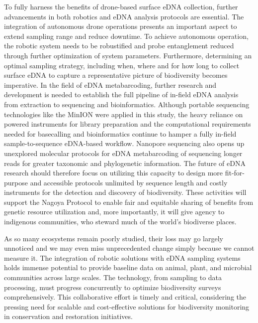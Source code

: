 To fully harness the benefits of drone-based surface \gls{eDNA} collection, further advancements in both robotics and \gls{eDNA} analysis protocols are essential. The integration of autonomous drone operations presents an important aspect to extend sampling range and reduce downtime. To achieve autonomous operation, the robotic system needs to be robustified and probe entanglement reduced through further optimization of system parameters. Furthermore, determining  an optimal sampling strategy, including when, where and for how long to collect surface \gls{eDNA} to capture a representative picture of biodiversity becomes imperative.
In the field of \gls{eDNA} metabarcoding, further research and development is needed to establish the full pipeline of in-field \gls{eDNA} analysis from extraction to sequencing and bioinformatics. Although portable sequencing technologies like the MinION were applied in this study, the heavy reliance on powered instruments for library preparation and the computational requirements needed for basecalling and bioinformatics continue to hamper a fully in-field sample-to-sequence eDNA-based workflow. Nanopore sequencing also opens up unexplored molecular protocols for \gls{eDNA} metabarcoding of sequencing longer reads for greater taxonomic and phylogenetic information. The future of \gls{eDNA} research should therefore focus on utilizing this capacity to design more fit-for-purpose and accessible protocols unlimited by sequence length and costly instruments for the detection and discovery of biodiversity. These activities will support the Nagoya Protocol \cite{nagoya} to enable fair and equitable sharing of benefits from genetic resource utilization and, more importantly, it will give agency to indigenous communities, who steward much of the world's biodiverse places. 

As so many ecosystems remain poorly studied, their loss may go largely unnoticed and we may even miss unprecedented change simply because we cannot measure it. The integration of robotic solutions with \gls{eDNA} sampling systems holds immense potential to provide baseline data on animal, plant, and microbial communities across large scales. The technology, from sampling to data processing, must progress concurrently to optimize biodiversity surveys comprehensively. This collaborative effort is timely and critical, considering the pressing need for scalable and cost-effective solutions for biodiversity monitoring in conservation and restoration initiatives.

